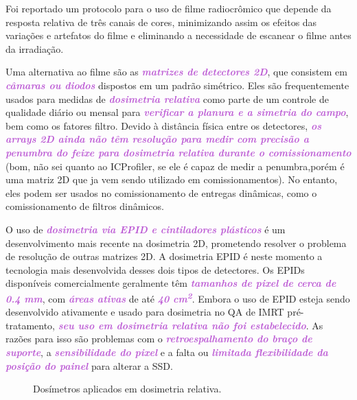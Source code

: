 \documentclass[11pt,a4paper]{article}
\begin{document}
	Foi reportado um protocolo para o uso de filme radiocrômico que depende da resposta relativa de três canais de cores, minimizando assim os efeitos das variações e artefatos do filme e eliminando a necessidade de escanear o filme antes da irradiação.

	Uma alternativa ao filme são as \textcolor{MediumOrchid}{\textbf{\textit{matrizes de detectores 2D}}}, que consistem em \textcolor{MediumOrchid}{\textbf{\textit{câmaras ou diodos}}} dispostos em um padrão simétrico. Eles são frequentemente usados para medidas de \textcolor{MediumOrchid}{\textbf{\textit{dosimetria relativa}}} como parte de um controle de qualidade diário ou mensal para \textcolor{MediumOrchid}{\textbf{\textit{verificar a planura e a simetria do campo}}}, bem como os fatores filtro. Devido à distância física entre os detectores, \textcolor{MediumOrchid}{\textbf{\textit{os arrays 2D ainda não têm resolução para medir com precisão a penumbra do feixe para dosimetria relativa durante o comissionamento}}} (bom, não sei quanto ao ICProfiler, se ele é capaz de medir a penumbra,porém é uma matriz 2D que ja vem sendo utilizado em comissionamentos). No entanto, eles podem ser usados no comissionamento de entregas dinâmicas, como o comissionamento de filtros dinâmicos.

	O uso de \textcolor{MediumOrchid}{\textbf{\textit{dosimetria via EPID e cintiladores plásticos}}} é um desenvolvimento mais recente na dosimetria 2D, prometendo resolver o problema de resolução de outras matrizes 2D. A dosimetria EPID é neste momento a tecnologia mais desenvolvida desses dois tipos de detectores. Os EPIDs disponíveis comercialmente geralmente têm \textcolor{MediumOrchid}{\textbf{\textit{tamanhos de pixel de cerca de 0.4 mm}}}, com \textcolor{MediumOrchid}{\textbf{\textit{áreas ativas}}} de até \textcolor{MediumOrchid}{\textbf{\textit{40 \unit{cm^2}}}}. Embora o uso de EPID esteja sendo desenvolvido ativamente e usado para dosimetria no QA de IMRT pré-tratamento, \textcolor{MediumOrchid}{\textbf{\textit{seu uso em dosimetria relativa não foi estabelecido}}}. As razões para isso são problemas com o \textcolor{MediumOrchid}{\textbf{\textit{retroespalhamento do braço de suporte}}}, a \textcolor{MediumOrchid}{\textbf{\textit{sensibilidade do pixel}}} e a falta ou \textcolor{MediumOrchid}{\textbf{\textit{limitada flexibilidade da posição do painel}}} para alterar a SSD.

	\begin{figure}[h]
		\centering
		\caption{Dosímetros aplicados em dosimetria relativa.}
		\label{fig:dosimetrosDosimetriaRelativa}
	\end{figure}
\end{document}
